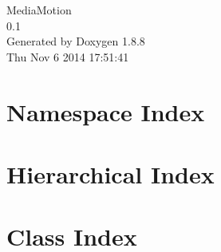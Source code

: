 \documentclass[twoside]{book}
\newcommand{\+}{\discretionary{\mbox{\scriptsize$\hookleftarrow$}}{}{}}
\newcommand{\clearemptydoublepage}{%
  \newpage{\pagestyle{empty}\cleardoublepage}%
}
\begin{document}
\hypersetup{pageanchor=false,
             bookmarks=true,
             bookmarksnumbered=true,
             pdfencoding=unicode
            }
\begin{titlepage}
\vspace*{7cm}
\begin{center}%
{\Large Media\+Motion \\[1ex]\large 0.\+1 }\\
\vspace*{1cm}
{\large Generated by Doxygen 1.8.8}\\
\vspace*{0.5cm}
{\small Thu Nov 6 2014 17:51:41}\\
\end{center}
\end{titlepage}
\clearemptydoublepage
\tableofcontents
\clearemptydoublepage
{}
\hypersetup{pageanchor=true}

\chapter{Namespace Index}

\chapter{Hierarchical Index}

\chapter{Class Index}

\end{document}
